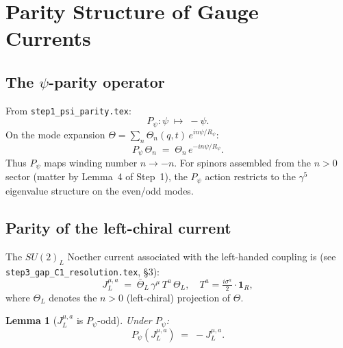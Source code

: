 \documentclass[12pt,a4paper]{article}
\newtheorem{lemma}[theorem]{Lemma}
\theoremstyle{definition}
\theoremstyle{remark}
\begin{document}
\section{Parity Structure of Gauge Currents}
\label{sec:parity}

\subsection{The $\psi$-parity operator}

From \texttt{step1\_psi\_parity.tex}:
\begin{equation}
  P_\psi:\psi\;\mapsto\;-\psi.
\end{equation}
On the mode expansion $\Theta = \sum_n \Theta_n(q,t)\,e^{in\psi/R_\psi}$:
\begin{equation}
  P_\psi\,\Theta_n \;=\; \Theta_n\,e^{-in\psi/R_\psi}.
\end{equation}
Thus $P_\psi$ maps winding number $n\to-n$.  For spinors assembled from the
$n>0$ sector (matter by Lemma~4 of Step~1), the $P_\psi$ action restricts to
the $\gamma^5$ eigenvalue structure on the even/odd modes.

\subsection{Parity of the left-chiral current}

The $SU(2)_L$ Noether current associated with the left-handed coupling is
(see \texttt{step3\_gap\_C1\_resolution.tex}, §3):
\begin{equation}
  J^{\mu,a}_L
  \;=\;
  \bar\Theta_L\,\gamma^\mu\,T^a\,\Theta_L,
  \quad
  T^a = \tfrac{i\sigma^a}{2}\cdot\mathbf{1}_R,
\end{equation}
where $\Theta_L$ denotes the $n>0$ (left-chiral) projection of $\Theta$.

\begin{lemma}[$J^{\mu,a}_L$ is $P_\psi$-odd]
\label{lem:JL_odd}
Under $P_\psi$:
\begin{equation}
  P_\psi\!\left(J^{\mu,a}_L\right) \;=\; -J^{\mu,a}_L.
\end{equation}
\end{lemma}
\end{document}

